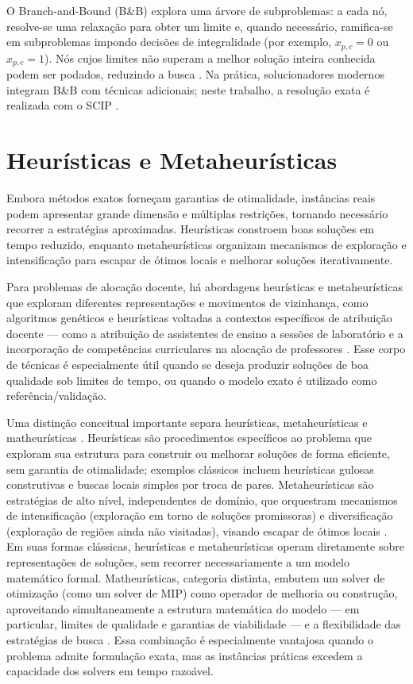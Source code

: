 O Branch-and-Bound (B\&B) explora uma árvore de subproblemas: a cada nó, resolve-se uma relaxação para obter um limite e, quando necessário, ramifica-se em subproblemas impondo decisões de integralidade (por exemplo, $x_{p,c}=0$ ou $x_{p,c}=1$). Nós cujos limites não superam a melhor solução inteira conhecida podem ser podados, reduzindo a busca \cite{wolsey_2020}. Na prática, solucionadores modernos integram B\&B com técnicas adicionais; neste trabalho, a resolução exata é realizada com o SCIP \cite{gamrath_2020_scip}.

\section{Heurísticas e Metaheurísticas}

Embora métodos exatos forneçam garantias de otimalidade, instâncias reais podem apresentar grande dimensão e múltiplas restrições, tornando necessário recorrer a estratégias aproximadas. Heurísticas constroem boas soluções em tempo reduzido, enquanto metaheurísticas organizam mecanismos de exploração e intensificação para escapar de ótimos locais e melhorar soluções iterativamente.

Para problemas de alocação docente, há abordagens heurísticas e metaheurísticas que exploram diferentes representações e movimentos de vizinhança, como algoritmos genéticos \cite{gunawan_ng_ong_2008} e heurísticas voltadas a contextos específicos de atribuição docente --- como a atribuição de assistentes de ensino a sessões de laboratório \cite{hosny_2013} e a incorporação de competências curriculares na alocação de professores \cite{szwarc_2018}. Esse corpo de técnicas é especialmente útil quando se deseja produzir soluções de boa qualidade sob limites de tempo, ou quando o modelo exato é utilizado como referência/validação.

Uma distinção conceitual importante separa heurísticas, metaheurísticas e matheurísticas \cite{blum_roli_2003,maniezzo_stutzle_voss_2021}. Heurísticas são procedimentos específicos ao problema que exploram sua estrutura para construir ou melhorar soluções de forma eficiente, sem garantia de otimalidade; exemplos clássicos incluem heurísticas gulosas construtivas e buscas locais simples por troca de pares. Metaheurísticas são estratégias de alto nível, independentes de domínio, que orquestram mecanismos de intensificação (exploração em torno de soluções promissoras) e diversificação (exploração de regiões ainda não visitadas), visando escapar de ótimos locais \cite{blum_roli_2003}. Em suas formas clássicas, heurísticas e metaheurísticas operam diretamente sobre representações de soluções, sem recorrer necessariamente a um modelo matemático formal. Matheurísticas, categoria distinta, embutem um solver de otimização (como um solver de MIP) como operador de melhoria ou construção, aproveitando simultaneamente a estrutura matemática do modelo --- em particular, limites de qualidade e garantias de viabilidade --- e a flexibilidade das estratégias de busca \cite{maniezzo_stutzle_voss_2021,ball_2011}. Essa combinação é especialmente vantajosa quando o problema admite formulação exata, mas as instâncias práticas excedem a capacidade dos solvers em tempo razoável.

